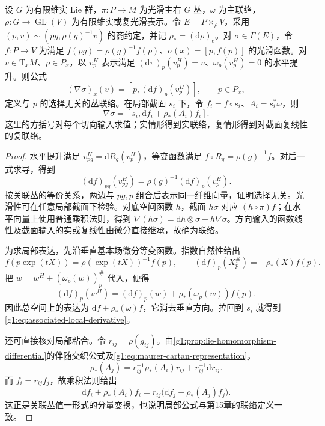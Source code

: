 \begin{theorem}\label{g1:thm:associated-covariant-derivative}
	设 \(G\) 为有限维实 Lie 群，\(\pi:P\to M\) 为光滑主右 \(G\) 丛，\(\omega\) 为主联络，\(\rho:G\to\operatorname{GL}(V)\) 为有限维实或复光滑表示。令 \(E=P\times_\rho V\)，采用 \((p,v)\sim(pg,\rho(g)^{-1}v)\) 的商约定，并记 \(\rho_*=(\mathrm{d}\rho)_e\)。对 \(\sigma\in\Gamma(E)\)，令 \(f:P\to V\) 为满足 \(f(pg)=\rho(g)^{-1}f(p)\)、\(\sigma(x)=[p,f(p)]\) 的光滑函数。对 \(v\in\mathrm{T}_xM\)、\(p\in P_x\)，以 \(v_p^H\) 表示满足 \((\mathrm{d}\pi)_p(v_p^H)=v\)、\(\omega_p(v_p^H)=0\) 的水平提升。则公式
	\begin{equation}\label{g1:eq:associated-horizontal-derivative}
		(\nabla\sigma)_x(v)=[p,(\mathrm{d}f)_p(v_p^H)],
		\qquad p\in P_x,
	\end{equation}
	定义与 \(p\) 的选择无关的丛联络。在局部截面 \(s_i\) 下，令 \(f_i=f\circ s_i\)、\(A_i=s_i^*\omega\)，则
	\begin{equation}\label{g1:eq:associated-local-derivative}
		\nabla\sigma=[s_i,\mathrm{d}f_i+\rho_*(A_i)f_i].
	\end{equation}
	这里的方括号对每个切向输入求值；实情形得到实联络，复情形得到对截面复线性的复联络。
\end{theorem}
\begin{proof}
	水平提升满足 \(v_{pg}^H=\mathrm{d}R_g(v_p^H)\)，等变函数满足 \(f\circ R_g=\rho(g)^{-1}f\)。对后一式求导，得到
	\[
		(\mathrm{d}f)_{pg}(v_{pg}^H)=\rho(g)^{-1}(\mathrm{d}f)_p(v_p^H).
	\]
	按关联丛的等价关系，两边与 \(pg,p\) 组合后表示同一纤维向量，证明选择无关。光滑性可在任意局部截面下检验。对底空间函数 \(h\)，截面 \(h\sigma\) 对应 \((h\circ\pi)f\)；在水平向量上使用普通乘积法则，得到 \(\nabla(h\sigma)=\mathrm{d}h\otimes\sigma+h\nabla\sigma\)。方向输入的函数线性及截面输入的实或复线性由微分直接继承，故确为联络。

	为求局部表达，先沿垂直基本场微分等变函数。指数自然性给出
	\[
		f(p\exp(tX))=\rho(\exp(tX))^{-1}f(p),
		\qquad (\mathrm{d}f)_p(X_p^\#)=-\rho_*(X)f(p).
	\]
	把 \(w=w^H+(\omega_p(w))_p^\#\) 代入，便得
	\begin{equation}\label{g1:eq:equivariant-covariant-derivative}
		(\mathrm{d}f)_p(w^H)=(\mathrm{d}f)_p(w)+\rho_*(\omega_p(w))f(p).
	\end{equation}
	因此总空间上的表达为 \(\mathrm{d}f+\rho_*(\omega)f\)，它消去垂直方向。拉回到 \(s_i\) 就得到\eqref{g1:eq:associated-local-derivative}。

	还可直接核对局部粘合。令 \(r_{ij}=\rho(g_{ij})\)。由\cref{g1:prop:lie-homomorphism-differential}的伴随交织公式及\eqref{g1:eq:maurer-cartan-representation}，
	\[
		\rho_*(A_j)=r_{ij}^{-1}\rho_*(A_i)r_{ij}+r_{ij}^{-1}\mathrm{d}r_{ij}.
	\]
	而 \(f_i=r_{ij}f_j\)，故乘积法则给出
	\[
		\mathrm{d}f_i+\rho_*(A_i)f_i
		=r_{ij}\bigl(\mathrm{d}f_j+\rho_*(A_j)f_j\bigr).
	\]
	这正是关联丛值一形式的分量变换，也说明局部公式与第15章的联络定义一致。
\end{proof}

